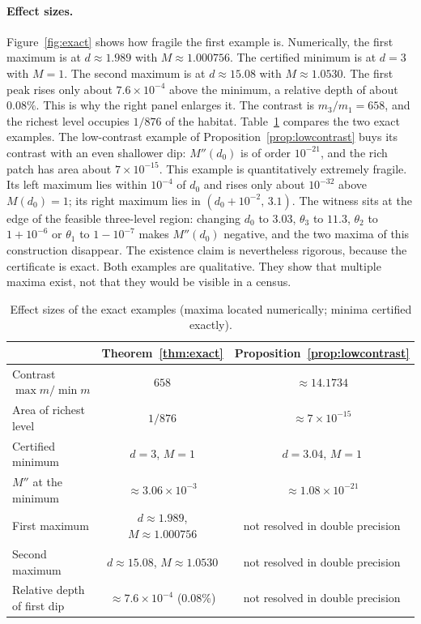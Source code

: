 \documentclass[11pt]{article}
\theoremstyle{remark}
\begin{document}
\paragraph{Effect sizes.}
Figure~\ref{fig:exact} shows how fragile the first example is.
Numerically, the first maximum is at \(d\approx1.989\) with
\(M\approx1.000756\). The certified minimum is at \(d=3\) with \(M=1\). The
second maximum is at \(d\approx15.08\) with \(M\approx1.0530\). The first
peak rises only about \(7.6\times10^{-4}\) above the minimum, a relative
depth of about \(0.08\%\). This is why the right panel enlarges it. The
contrast is \(m_3/m_1=658\), and the richest level occupies \(1/876\) of
the habitat. Table~\ref{tab:effects} compares the two exact examples.
The low-contrast example of Proposition~\ref{prop:lowcontrast} buys its
contrast with an even shallower dip: \(M''(d_0)\) is of order
\(10^{-21}\), and the rich patch has area about \(7\times10^{-15}\).
This example is quantitatively extremely fragile. Its left maximum lies
within \(10^{-4}\) of \(d_0\) and rises only about \(10^{-32}\) above
\(M(d_0)=1\); its right maximum lies in \((d_0+10^{-2},\,3.1)\). The
witness sits at the edge of the feasible three-level region: changing
\(d_0\) to \(3.03\), \(\theta_3\) to \(11.3\), \(\theta_2\) to \(1+10^{-6}\) or
\(\theta_1\) to \(1-10^{-7}\) makes \(M''(d_0)\) negative, and the two maxima
of this construction disappear. The existence claim is nevertheless
rigorous, because the certificate is exact. Both examples are
qualitative. They show that multiple maxima exist, not that they would be
visible in a census.

\begin{table}[t]
\centering
\caption{Effect sizes of the exact examples (maxima located numerically;
minima certified exactly).}
\label{tab:effects}
\begin{tabular}{lcc}
\toprule
 & Theorem~\ref{thm:exact} & Proposition~\ref{prop:lowcontrast}\\
\midrule
Contrast \(\max m/\min m\) & \(658\) & \(\approx14.1734\)\\
Area of richest level & \(1/876\) & \(\approx7\times10^{-15}\)\\
Certified minimum & \(d=3\), \(M=1\) & \(d=3.04\), \(M=1\)\\
\(M''\) at the minimum & \(\approx3.06\times10^{-3}\) & \(\approx1.08\times10^{-21}\)\\
First maximum & \(d\approx1.989\), \(M\approx1.000756\) & not resolved in double precision\\
Second maximum & \(d\approx15.08\), \(M\approx1.0530\) & not resolved in double precision\\
Relative depth of first dip & \(\approx7.6\times10^{-4}\) (0.08\%) & not resolved in double precision\\
\bottomrule
\end{tabular}
\end{table}
\end{document}
